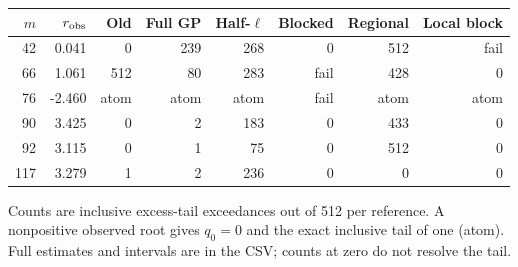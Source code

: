 \begin{center}\small\begin{tabular}{rrrrrrrr}\toprule
$m$ & $r_{\rm obs}$ & Old & Full GP & Half-$\ell$ & Blocked & Regional & Local block\\\midrule
42 & 0.041 & 0 & 239 & 268 & 0 & 512 & fail\\
66 & 1.061 & 512 & 80 & 283 & fail & 428 & 0\\
76 & -2.460 & atom & atom & atom & fail & atom & atom\\
90 & 3.425 & 0 & 2 & 183 & 0 & 433 & 0\\
92 & 3.115 & 0 & 1 & 75 & 0 & 512 & 0\\
117 & 3.279 & 1 & 2 & 236 & 0 & 0 & 0\\
\bottomrule\end{tabular}\end{center}
Counts are inclusive excess-tail exceedances out of 512 per reference. A nonpositive observed root gives $q_0=0$ and the exact inclusive tail of one (atom). Full estimates and intervals are in the CSV; counts at zero do not resolve the tail.
